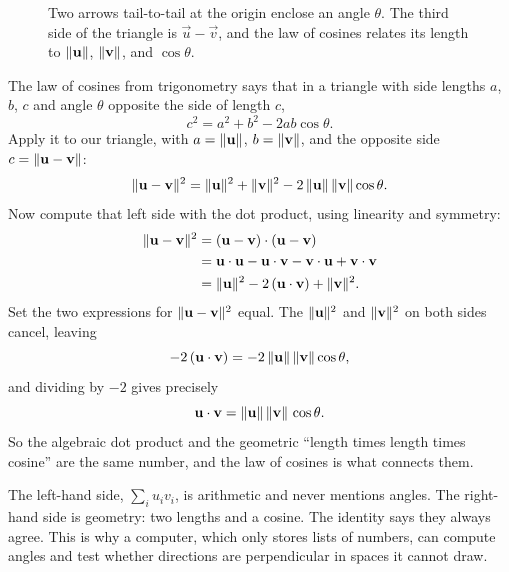 \begin{figure}[htbp]
\centering
{}
\caption{Two arrows tail-to-tail at the origin enclose an angle $\theta$. The
third side of the triangle is $\vec u-\vec v$, and the law of cosines relates its
length to $\lVert\mathbf{u}\rVert$, $\lVert\mathbf{v}\rVert$, and $\cos\theta$.}
\label{ch04:loc}
\end{figure}

The law of cosines from trigonometry says that in a triangle with side lengths
$a$, $b$, $c$ and angle $\theta$ opposite the side of length $c$,
\[
  c^2 = a^2 + b^2 - 2ab\cos\theta.
\]
Apply it to our triangle, with $a = \lVert\mathbf{u}\rVert$, $b = \lVert\mathbf{v}\rVert$, and the
opposite side $c = \lVert\mathbf{u} - \mathbf{v}\rVert$:
\[
  \lVert\mathbf{u} - \mathbf{v}\rVert^2
    = \lVert\mathbf{u}\rVert^2 + \lVert\mathbf{v}\rVert^2 - 2\,\lVert\mathbf{u}\rVert\,\lVert\mathbf{v}\rVert\cos\theta.
\]
Now compute that left side with the dot product, using linearity and symmetry:
\begin{align*}
  \lVert\mathbf{u} - \mathbf{v}\rVert^2
    &= (\mathbf{u} - \mathbf{v})\cdot(\mathbf{u} - \mathbf{v}) \\
    &= \mathbf{u}\cdot\mathbf{u} - \mathbf{u}\cdot\mathbf{v} - \mathbf{v}\cdot\mathbf{u} + \mathbf{v}\cdot\mathbf{v} \\
    &= \lVert\mathbf{u}\rVert^2 - 2\,(\mathbf{u}\cdot\mathbf{v}) + \lVert\mathbf{v}\rVert^2.
\end{align*}
Set the two expressions for $\lVert\mathbf{u}-\mathbf{v}\rVert^2$ equal. The
$\lVert\mathbf{u}\rVert^2$ and $\lVert\mathbf{v}\rVert^2$ on both sides cancel, leaving
\[
  -2\,(\mathbf{u}\cdot\mathbf{v}) = -2\,\lVert\mathbf{u}\rVert\,\lVert\mathbf{v}\rVert\cos\theta,
\]
and dividing by $-2$ gives precisely
\[
  \mathbf{u}\cdot\mathbf{v} = \lVert\mathbf{u}\rVert\,\lVert\mathbf{v}\rVert\,\cos\theta.
\]
So the algebraic dot product and the geometric ``length times length times cosine''
are the same number, and the law of cosines is what connects them.

\begin{aestheticbox}
The left-hand side, $\sum_i u_iv_i$, is arithmetic and never mentions angles. The
right-hand side is geometry: two lengths and a cosine. The identity says they always
agree. This is why a computer, which only stores lists of numbers, can compute angles
and test whether directions are perpendicular in spaces it cannot draw.
\end{aestheticbox}

